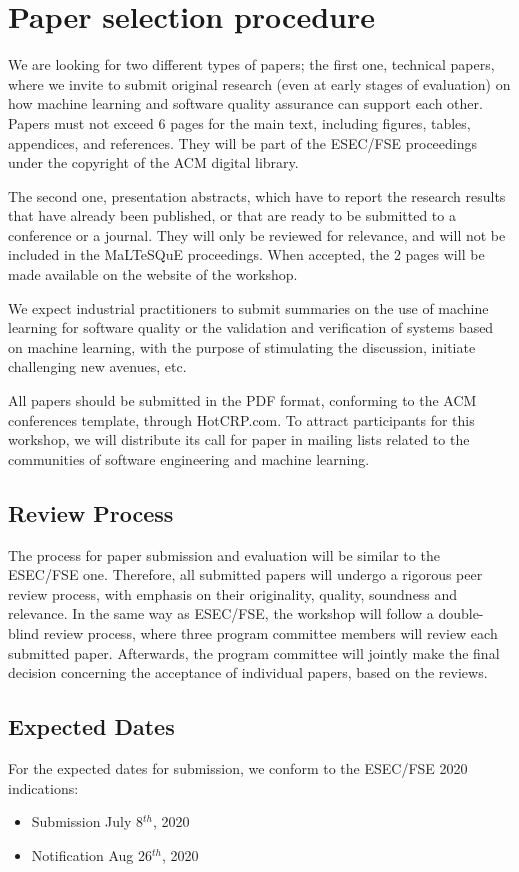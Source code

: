 \section{Paper selection procedure}
\label{sec:submissions}

We are looking for two different types of papers; the first one, \ie technical papers, where we invite to submit original research (even at early stages of evaluation) on how machine learning and software quality assurance can support each other.
Papers must not exceed 6 pages for the main text, including figures, tables, appendices, and references.
They will be part of the ESEC/FSE proceedings under the copyright of the ACM digital library.

The second one, \ie presentation abstracts, which have to report the research results that have already been published, or that are ready to be submitted to a conference or a journal.
They will only be reviewed for relevance, and will not be included in the MaLTeSQuE proceedings.
When accepted, the 2 pages will be made available on the website of the workshop.

We expect industrial practitioners to submit summaries on the use of machine learning for software quality or the validation and verification of systems based on machine learning, with the purpose of stimulating the discussion, initiate challenging new avenues, etc.

All papers should be submitted in the PDF format, conforming to the ACM conferences template, through HotCRP.com.
To attract participants for this workshop, we will distribute its call for paper in mailing lists related to the communities of software engineering and machine learning.

\subsection{Review Process}
The process for paper submission and evaluation will be similar to the ESEC/FSE one.
Therefore, all submitted papers will undergo a rigorous peer review process, with emphasis on their originality, quality, soundness and relevance.
In the same way as ESEC/FSE, the workshop will follow a double-blind review process, where three program committee members will review each submitted paper.
Afterwards, the program committee will jointly make the final decision concerning the acceptance of individual papers, based on the reviews.

\subsection{Expected Dates}
For the expected dates for submission, we conform to the ESEC/FSE 2020 indications:
\begin{itemize}[itemsep=0.5em]
	\item Submission July 8$^{th}$, 2020
	\item Notification Aug 26$^{th}$, 2020
\end{itemize}


